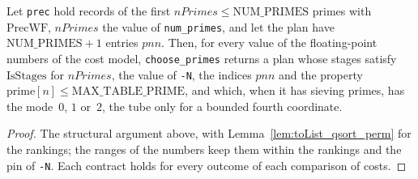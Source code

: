 \begin{lemma}\label{lem:choosePrimes_spec}
  \leanok
  Let \texttt{prec} hold records of the first $\mathit{nPrimes} \le \mathrm{NUM\_PRIMES}$ primes
  with $\mathrm{PrecWF}$, $\mathit{nPrimes}$ the value of \texttt{num\_primes}, and let the plan
  have $\mathrm{NUM\_PRIMES} + 1$ entries $\mathit{pnn}$. Then, for every value of the
  floating-point numbers of the cost model, \texttt{choose\_primes} returns a plan whose stages
  satisfy $\mathrm{IsStages}$ for $\mathit{nPrimes}$, the value of \texttt{-N}, the indices
  $\mathit{pnn}$ and the property $\mathrm{prime}[n] \le \mathrm{MAX\_TABLE\_PRIME}$, and which,
  when it has sieving primes, has the mode~$0$, $1$ or~$2$, the tube only for a bounded fourth
  coordinate.
\end{lemma}

\begin{proof}
  \leanok
  The structural argument above, with Lemma~\ref{lem:toList_qsort_perm} for the rankings; the ranges
  of the numbers keep them within the rankings and the pin of \texttt{-N}. Each contract holds for
  every outcome of each comparison of costs.
\end{proof}


